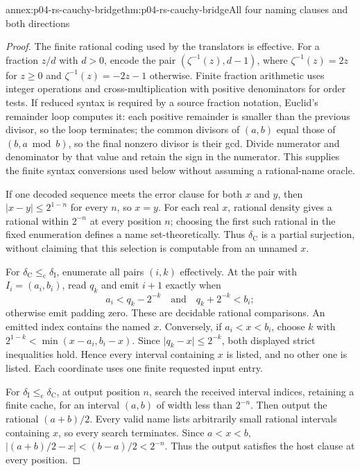 \begin{annexitem}{annex:p04-rs-cauchy-bridge}{thm:p04-rs-cauchy-bridge}{All four naming clauses and both directions}
\begin{proof}
The finite rational coding used by the translators is effective.
For a fraction \(z/d\) with \(d>0\), encode the pair
\((\zeta^{-1}(z),d-1)\), where
\(\zeta^{-1}(z)=2z\) for \(z\geq0\) and
\(\zeta^{-1}(z)=-2z-1\) otherwise.
Finite fraction arithmetic uses integer operations and
cross-multiplication with positive denominators for order tests.
If reduced syntax is required by a source fraction notation,
Euclid's remainder loop computes it: each positive remainder
is smaller than the previous divisor, so the loop terminates;
the common divisors of \((a,b)\) equal those of
\((b,a\bmod b)\), so the final nonzero divisor is their gcd.
Divide numerator and denominator by that value and retain
the sign in the numerator. This supplies the finite syntax
conversions used below without assuming a rational-name oracle.

If one decoded sequence meets the error clause for both \(x\)
and \(y\), then \(\lvert x-y\rvert\leq2^{1-n}\) for every \(n\),
so \(x=y\). For each real \(x\), rational density gives a rational
within \(2^{-n}\) at every position \(n\); choosing the first
such rational in the fixed enumeration defines a name
set-theoretically. Thus \(\delta_{\mathrm C}\) is a partial
surjection, without claiming that this selection is computable
from an unnamed \(x\).

For \(\delta_{\mathrm C}\leq_{\mathrm c}\delta_{\mathrm I}\),
enumerate all pairs \((i,k)\) effectively.
At the pair with \(I_i=(a_i,b_i)\), read \(q_k\) and emit
\(i+1\) exactly when
\[
 a_i<q_k-2^{-k}
 \quad\text{and}\quad
 q_k+2^{-k}<b_i;
\]
otherwise emit padding zero. These are decidable rational
comparisons. An emitted index contains the named \(x\).
Conversely, if \(a_i<x<b_i\), choose \(k\) with
\(2^{1-k}<\min(x-a_i,b_i-x)\). Since
\(\lvert q_k-x\rvert\leq2^{-k}\), both displayed strict
inequalities hold. Hence every interval containing \(x\)
is listed, and no other one is listed.
Each coordinate uses one finite requested input entry.

For \(\delta_{\mathrm I}\leq_{\mathrm c}\delta_{\mathrm C}\),
at output position \(n\), search the received interval indices,
retaining a finite cache, for an interval \((a,b)\) of width
less than \(2^{-n}\). Then output the rational \((a+b)/2\).
Every valid name lists arbitrarily small rational intervals
containing \(x\), so every search terminates.
Since \(a<x<b\),
\(\lvert(a+b)/2-x\rvert<(b-a)/2<2^{-n}\).
Thus the output satisfies the host clause at every position.


\end{proof}
\end{annexitem}
